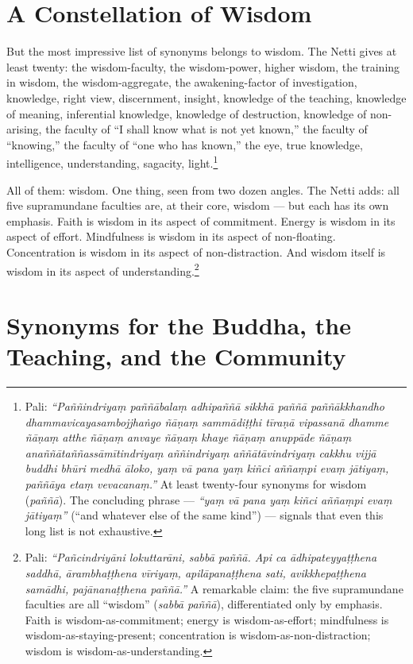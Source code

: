 \section*{A Constellation of Wisdom}

But the most impressive list of synonyms belongs to wisdom. The Netti gives at least twenty: the wisdom-faculty, the wisdom-power, higher wisdom, the training in wisdom, the wisdom-aggregate, the awakening-factor of investigation, knowledge, right view, discernment, insight, knowledge of the teaching, knowledge of meaning, inferential knowledge, knowledge of destruction, knowledge of non-arising, the faculty of ``I shall know what is not yet known,'' the faculty of ``knowing,'' the faculty of ``one who has known,'' the eye, true knowledge, intelligence, understanding, sagacity, light.\footnote{Pali: \textit{``Paññindriyaṃ paññābalaṃ adhipaññā sikkhā paññā paññākkhandho dhammavicayasambojjhaṅgo ñāṇaṃ sammādiṭṭhi tīraṇā vipassanā dhamme ñāṇaṃ atthe ñāṇaṃ anvaye ñāṇaṃ khaye ñāṇaṃ anuppāde ñāṇaṃ anaññātaññassāmītindriyaṃ aññindriyaṃ aññātāvindriyaṃ cakkhu vijjā buddhi bhūri medhā āloko, yaṃ vā pana yaṃ kiñci aññaṃpi evaṃ jātiyaṃ, paññāya etaṃ vevacanaṃ.''} At least twenty-four synonyms for wisdom (\textit{paññā}). The concluding phrase --- \textit{``yaṃ vā pana yaṃ kiñci aññaṃpi evaṃ jātiyaṃ''} (``and whatever else of the same kind'') --- signals that even this long list is not exhaustive.}

All of them: wisdom. One thing, seen from two dozen angles. The Netti adds: all five supramundane faculties are, at their core, wisdom --- but each has its own emphasis. Faith is wisdom in its aspect of commitment. Energy is wisdom in its aspect of effort. Mindfulness is wisdom in its aspect of non-floating. Concentration is wisdom in its aspect of non-distraction. And wisdom itself is wisdom in its aspect of understanding.\footnote{Pali: \textit{``Pañcindriyāni lokuttarāni, sabbā paññā. Api ca ādhipateyyaṭṭhena saddhā, ārambhaṭṭhena vīriyaṃ, apilāpanaṭṭhena sati, avikkhepaṭṭhena samādhi, pajānanaṭṭhena paññā.''} A remarkable claim: the five supramundane faculties are all ``wisdom'' (\textit{sabbā paññā}), differentiated only by emphasis. Faith is wisdom-as-commitment; energy is wisdom-as-effort; mindfulness is wisdom-as-staying-present; concentration is wisdom-as-non-distraction; wisdom is wisdom-as-understanding.}

\section*{Synonyms for the Buddha, the Teaching, and the Community}

